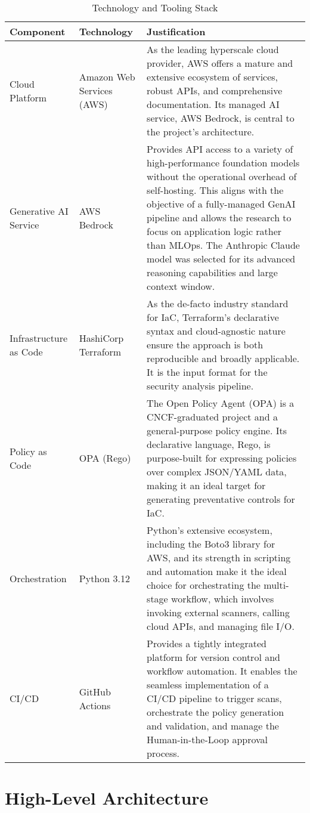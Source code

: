 \begin{table}[h!]
\centering
\begin{tabular}{|l|l|p{7cm}|}
\hline
\textbf{Component} & \textbf{Technology} & \textbf{Justification} \\
\hline
Cloud Platform & Amazon Web Services (AWS) & As the leading hyperscale cloud provider, AWS offers a mature and extensive ecosystem of services, robust APIs, and comprehensive documentation. Its managed AI service, AWS Bedrock, is central to the project's architecture. \\
\hline
Generative AI Service & AWS Bedrock & Provides API access to a variety of high-performance foundation models without the operational overhead of self-hosting. This aligns with the objective of a fully-managed GenAI pipeline and allows the research to focus on application logic rather than MLOps. The Anthropic Claude model was selected for its advanced reasoning capabilities and large context window. \\
\hline
Infrastructure as Code & HashiCorp Terraform & As the de-facto industry standard for IaC, Terraform's declarative syntax and cloud-agnostic nature ensure the approach is both reproducible and broadly applicable. It is the input format for the security analysis pipeline. \\
\hline
Policy as Code & OPA (Rego) & The Open Policy Agent (OPA) is a CNCF-graduated project and a general-purpose policy engine. Its declarative language, Rego, is purpose-built for expressing policies over complex JSON/YAML data, making it an ideal target for generating preventative controls for IaC. \\
\hline
Orchestration & Python 3.12 & Python's extensive ecosystem, including the Boto3 library for AWS, and its strength in scripting and automation make it the ideal choice for orchestrating the multi-stage workflow, which involves invoking external scanners, calling cloud APIs, and managing file I/O. \\
\hline
CI/CD & GitHub Actions & Provides a tightly integrated platform for version control and workflow automation. It enables the seamless implementation of a CI/CD pipeline to trigger scans, orchestrate the policy generation and validation, and manage the Human-in-the-Loop approval process. \\
\hline
\end{tabular}
\caption{Technology and Tooling Stack}
\label{tab:tech_stack}
\end{table}

\section{High-Level Architecture}

